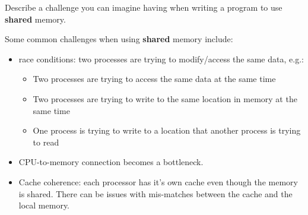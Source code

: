 \documentclass[12pt, answers]{exam}
\begin{document}
\begin{questions}

\addpoints
\question 
{}


\vspace*{2em}
\addpoints
\question 
{}


\vspace*{2em}
\addpoints
\question[10] Describe a challenge you can imagine having when writing a program to use \textbf{shared} memory.

\begin{solution}
Some common challenges when using \textbf{shared} memory include:
\begin{itemize}
\item race conditions: two processes are trying to modify/access the same data, e.g.:
\begin{itemize}
\item Two processes are trying to access the same data at the same time 
\item Two processes are trying to write to the same location in memory at the same time 
\item One process is trying to write to a location that another process is trying to read
\end{itemize}
\item CPU-to-memory connection becomes a bottleneck.
\item Cache coherence: each processor has it's own cache even though the memory is shared. There can be issues with mis-matches between the cache and the local memory. 
\end{itemize}
\end{solution}


\end{questions}
\end{document}
